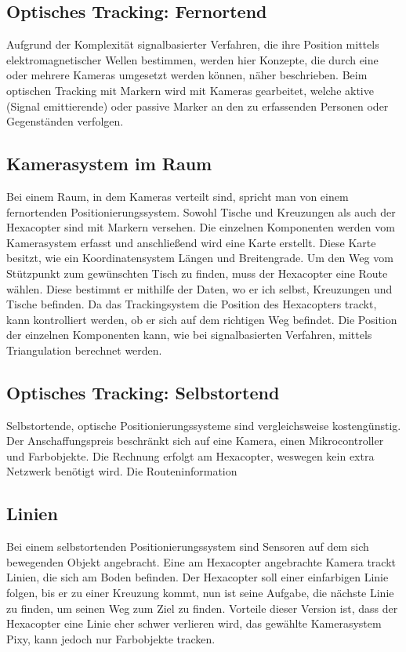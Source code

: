     \subsection{Optisches Tracking: Fernortend}
    Aufgrund der Komplexität signalbasierter Verfahren, die ihre Position mittels elektromagnetischer Wellen bestimmen, werden hier Konzepte, die durch eine oder mehrere Kameras umgesetzt werden können, näher beschrieben. Beim optischen Tracking mit Markern wird mit Kameras gearbeitet, welche aktive (Signal emittierende) oder passive Marker an den zu erfassenden Personen oder Gegenständen verfolgen. 

  \subsection*{Kamerasystem im Raum}
  Bei einem Raum, in dem Kameras verteilt sind, spricht man von einem fernortenden Positionierungssystem. 
  Sowohl Tische und Kreuzungen als auch der Hexacopter sind mit Markern versehen. Die einzelnen Komponenten werden vom Kamerasystem erfasst und anschließend wird eine Karte erstellt. Diese Karte besitzt, wie ein Koordinatensystem Längen und Breitengrade.
  Um den Weg vom Stützpunkt zum gewünschten Tisch zu finden, muss der Hexacopter eine Route wählen. Diese bestimmt er mithilfe der Daten, wo er ich selbst, Kreuzungen und Tische befinden. Da das Trackingsystem die Position des Hexacopters trackt, kann kontrolliert werden, ob er sich auf dem richtigen Weg befindet. Die Position der einzelnen Komponenten kann, wie bei signalbasierten Verfahren, mittels Triangulation berechnet werden.


  \subsection{Optisches Tracking: Selbstortend}
  Selbstortende, optische Positionierungssysteme sind vergleichsweise kostengünstig. Der Anschaffungspreis beschränkt sich auf eine Kamera, einen Mikrocontroller und Farbobjekte. Die Rechnung erfolgt am Hexacopter, weswegen kein extra Netzwerk benötigt wird. Die Routeninformation

  \subsection*{Linien}
  Bei einem selbstortenden Positionierungssystem sind Sensoren auf dem sich bewegenden Objekt angebracht.
  Eine am Hexacopter angebrachte Kamera trackt Linien, die sich am Boden befinden. Der Hexacopter soll einer einfarbigen Linie folgen, bis er zu einer Kreuzung kommt, nun ist seine Aufgabe, die nächste Linie zu finden, um seinen Weg zum Ziel zu finden.  
  Vorteile dieser Version ist, dass der Hexacopter eine Linie eher schwer verlieren wird, das gewählte Kamerasystem Pixy, kann jedoch nur Farbobjekte tracken.

